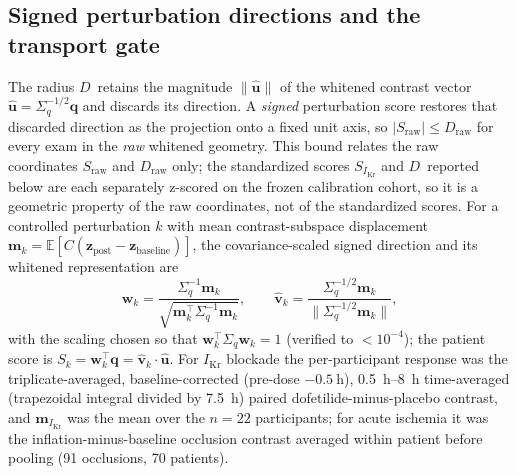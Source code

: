 \documentclass[11pt]{article}
\newcommand{\D}{\ensuremath{D}}
\begin{document}
\subsection{Signed perturbation directions and the transport gate}
\label{sec:transportmethods}
The radius \D\ retains the magnitude $\lVert\hat{\mathbf{u}}\rVert$ of the whitened
contrast vector $\hat{\mathbf{u}}=\Sigma_q^{-1/2}\mathbf{q}$ and discards its direction. A
\emph{signed} perturbation score restores that discarded direction as the projection onto
a fixed unit axis, so $|S_{\text{raw}}|\le\D_{\text{raw}}$ for every exam in the \emph{raw}
whitened geometry. This bound relates the raw coordinates $S_{\text{raw}}$ and $\D_{\text{raw}}$
only; the standardized scores $S_{I_{\text{Kr}}}$ and \D\ reported below are each separately
z-scored on the frozen calibration cohort, so it is a geometric property of the raw coordinates,
not of the standardized scores. For a controlled perturbation $k$ with
mean contrast-subspace displacement $\mathbf{m}_k=\mathbb{E}\!\left[C(\mathbf{z}_{\text{post}}-\mathbf{z}_{\text{baseline}})\right]$,
the covariance-scaled signed direction and its whitened representation are
\begin{equation}
\mathbf{w}_k=\frac{\Sigma_q^{-1}\mathbf{m}_k}{\sqrt{\mathbf{m}_k^{\top}\Sigma_q^{-1}\mathbf{m}_k}},
\qquad
\hat{\mathbf{v}}_k=\frac{\Sigma_q^{-1/2}\mathbf{m}_k}{\lVert\Sigma_q^{-1/2}\mathbf{m}_k\rVert},
\end{equation}
with the scaling chosen so that $\mathbf{w}_k^{\top}\Sigma_q\mathbf{w}_k=1$ (verified to
$<\!10^{-4}$); the patient score is $S_k=\mathbf{w}_k^{\top}\mathbf{q}=\hat{\mathbf{v}}_k\cdot\hat{\mathbf{u}}$.
For $I_{\text{Kr}}$ blockade the per-participant response was the triplicate-averaged,
baseline-corrected (pre-dose $-\SI{0.5}{\hour}$), \SIrange{0.5}{8}{\hour} time-averaged
(trapezoidal integral divided by \SI{7.5}{\hour}) paired dofetilide-minus-placebo
contrast, and $\mathbf{m}_{I_{\text{Kr}}}$ was the mean over the $n=\num{22}$
participants; for acute ischemia it was the inflation-minus-baseline occlusion contrast
averaged within patient before pooling (\num{91} occlusions, \num{70} patients).
\end{document}
